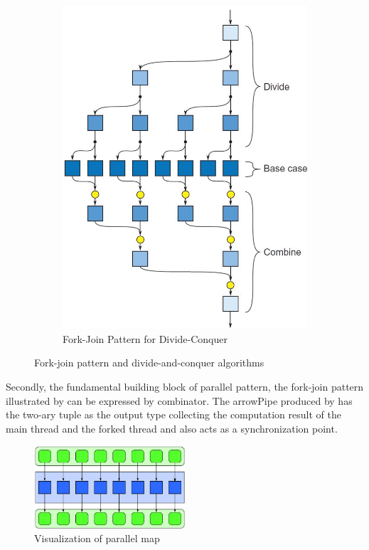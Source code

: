 \begin{figure}[ht]
\begin{subfigure}[b]{0.475\textwidth}
        \includegraphics[width=\textwidth]{arrow/dq.png}
        \caption{Fork-Join Pattern for Divide-Conquer \cite{mccoolStructuredParallelPrograming2012}}
        \label{arrowPipe:fig:dq}
    \end{subfigure}
    \caption{Fork-join pattern and divide-and-conquer algorithms}
\end{figure}
Secondly, the fundamental building block of parallel pattern, the fork-join pattern illustrated by  can be expressed by \hask{&&&} combinator. The arrowPipe produced by \hask{&&&} has the two-ary tuple as the output type collecting the computation result of the main thread and the forked thread and also acts as a synchronization point.
\begin{figure}[ht]
    \centering
    \includegraphics[width=0.5\textwidth]{arrow/pmap.png} 
    \caption{Visualization of parallel map \cite{mccoolStructuredParallelPrograming2012}}
    \label{arrow:fig:pmap}
\end{figure}
